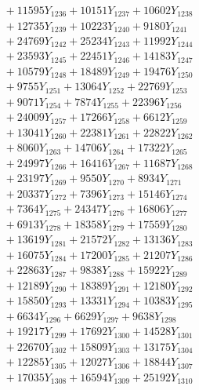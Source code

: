 \documentclass[a4paper,10pt]{article}
\begin{document}
{\begin{align}
&\;  + 11595 Y_{1236} + 10151 Y_{1237} + 10602 Y_{1238} \\[0.3ex]
&\;  + 12735 Y_{1239} + 10223 Y_{1240} + 9180 Y_{1241} \\[0.3ex]
&\;  + 24769 Y_{1242} + 25234 Y_{1243} + 11992 Y_{1244} \\[0.3ex]
&\;  + 23593 Y_{1245} + 22451 Y_{1246} + 14183 Y_{1247} \\[0.3ex]
&\;  + 10579 Y_{1248} + 18489 Y_{1249} + 19476 Y_{1250} \\[0.3ex]
&\;  + 9755 Y_{1251} + 13064 Y_{1252} + 22769 Y_{1253} \\[0.3ex]
&\;  + 9071 Y_{1254} + 7874 Y_{1255} + 22396 Y_{1256} \\[0.3ex]
&\;  + 24009 Y_{1257} + 17266 Y_{1258} + 6612 Y_{1259} \\[0.5ex]\allowbreak
&\;  + 13041 Y_{1260} + 22381 Y_{1261} + 22822 Y_{1262} \\[0.3ex]
&\;  + 8060 Y_{1263} + 14706 Y_{1264} + 17322 Y_{1265} \\[0.3ex]
&\;  + 24997 Y_{1266} + 16416 Y_{1267} + 11687 Y_{1268} \\[0.3ex]
&\;  + 23197 Y_{1269} + 9550 Y_{1270} + 8934 Y_{1271} \\[0.3ex]
&\;  + 20337 Y_{1272} + 7396 Y_{1273} + 15146 Y_{1274} \\[0.3ex]
&\;  + 7364 Y_{1275} + 24347 Y_{1276} + 16806 Y_{1277} \\[0.3ex]
&\;  + 6913 Y_{1278} + 18358 Y_{1279} + 17559 Y_{1280} \\[0.3ex]
&\;  + 13619 Y_{1281} + 21572 Y_{1282} + 13136 Y_{1283} \\[0.3ex]
&\;  + 16075 Y_{1284} + 17200 Y_{1285} + 21207 Y_{1286} \\[0.3ex]
&\;  + 22863 Y_{1287} + 9838 Y_{1288} + 15922 Y_{1289} \\[0.5ex]\allowbreak
&\;  + 12189 Y_{1290} + 18389 Y_{1291} + 12180 Y_{1292} \\[0.3ex]
&\;  + 15850 Y_{1293} + 13331 Y_{1294} + 10383 Y_{1295} \\[0.3ex]
&\;  + 6634 Y_{1296} + 6629 Y_{1297} + 9638 Y_{1298} \\[0.3ex]
&\;  + 19217 Y_{1299} + 17692 Y_{1300} + 14528 Y_{1301} \\[0.3ex]
&\;  + 22670 Y_{1302} + 15809 Y_{1303} + 13175 Y_{1304} \\[0.3ex]
&\;  + 12285 Y_{1305} + 12027 Y_{1306} + 18844 Y_{1307} \\[0.3ex]
&\;  + 17035 Y_{1308} + 16594 Y_{1309} + 25192 Y_{1310} \\[0.3ex]

\end{align}}
\end{document}
